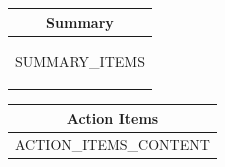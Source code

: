 \documentclass[11pt,a4paper]{article}
\begin{document}
\vspace{0.3cm}

\begin{tabularx}{\textwidth}{|X|}
\hline
\multicolumn{1}{|c|}{\textbf{Summary}} \\ \hline
\begin{itemize}[leftmargin=1.5em, label=\tiny$\bullet$, nosep, topsep=4pt, bottomsep=4pt]
{{SUMMARY_ITEMS}}
\end{itemize}
\\ \hline
\end{tabularx}

\vspace{0.3cm}

\begin{tabularx}{\textwidth}{|X|}
\hline
\multicolumn{1}{|c|}{\textbf{Action Items}} \\ \hline
{{ACTION_ITEMS_CONTENT}}
\\ \hline
\end{tabularx}
\end{document}
